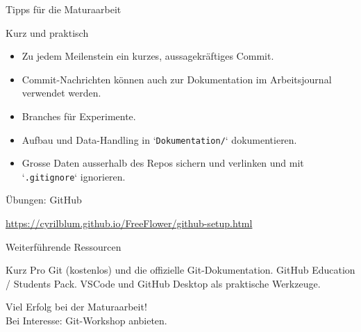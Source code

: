 \begin{frame}{Tipps für die Maturaarbeit}
    \centering
    \begin{block}{Kurz und praktisch}
        \begin{itemize}[<+->]
            \item Zu jedem Meilenstein ein kurzes, aussagekräftiges Commit.
            \item Commit-Nachrichten können auch zur Dokumentation im Arbeitsjournal verwendet werden.
            \item Branches für Experimente.
            \item Aufbau und Data-Handling in `\texttt{Dokumentation/}` dokumentieren.
            \item Grosse Daten ausserhalb des Repos sichern und verlinken und mit `\texttt{.gitignore}` ignorieren.
        \end{itemize}
    \end{block}
\end{frame}

\begin{frame}[fragile]{Übungen: GitHub}
    \begin{myExBox}[title={GitHub einrichten, Repo erstellen}]
        \scriptsize
        \url{https://cyrilblum.github.io/FreeFlower/github-setup.html}\\
    \end{myExBox}
\end{frame}



\begin{frame}{Weiterführende Ressourcen}
    \centering
    \begin{block}{Kurz}
        Pro Git (kostenlos) und die offizielle Git-Dokumentation. GitHub Education / Students Pack. VSCode und GitHub Desktop als praktische Werkzeuge.
    \end{block}
    \vspace{0.6em}
    \begin{center}
        \Large Viel Erfolg bei der Maturaarbeit!\\
        \small Bei Interesse: Git-Workshop anbieten.
    \end{center}
\end{frame}
